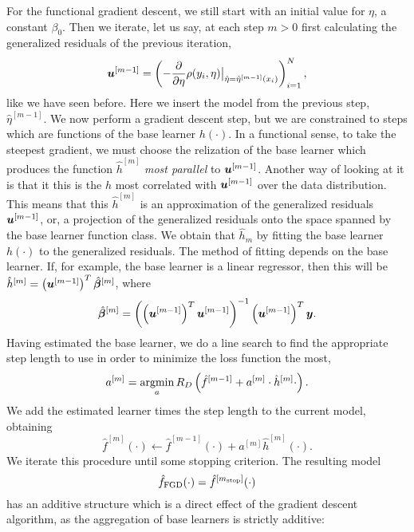 For the functional gradient descent, we still start with an initial value for $\eta$, a constant $\beta_0$.
Then we iterate, let us say, at each step $m>0$ first calculating the generalized residuals of the previous iteration,
\begin{equation}
    \bm{u}^{[m-1]}=\left(-\frac{\partial}{\partial \eta}\rho(y_i, \eta)\big\rvert_{\hat{\eta}=\hat{\eta}^{[m-1]}(x_i)}\right)_{i=1}^N,
\end{equation}
like we have seen before. Here we insert the model from the previous step, $\hat{\eta}^{[m-1]}$.
We now perform a gradient descent step, but we are constrained to steps which are functions of the base learner $h(\cdot)$.
In a functional sense, to take the steepest gradient, we must choose the relization of the base learner which produces the function $\hat{h}^{[m]}$ \textit{most parallel} to $\bm{u}^{[m-1]}$.
Another way of looking at it is that it this is the $h$ most  correlated with $\bm{u}^{[m-1]}$ over the data distribution.
This means that this $\hat{h}^{[m]}$ is an approximation of the generalized residuals $\bm{u}^{[m-1]}$, or, a projection of the generalized residuals onto the space spanned by the base learner function class.
We obtain that $\hat{h}_m$ by fitting the base learner $h(\cdot)$ to the generalized residuals.
The method of fitting depends on the base learner.
If, for example, the base learner is a linear regressor, then this will be $\hat{h}^{[m]}=\left(\bm{u}^{[m-1]}\right)^T\hat{\boldsymbol{\beta}}^{[m]}$, where
\begin{equation}
    \hat{\boldsymbol{\beta}}^{[m]}=\left(\left(\bm{u}^{[m-1]}\right)^T\bm{u}^{[m-1]}\right)^{-1}\left(\bm{u}^{[m-1]}\right)^T\bm{y}.
\end{equation}
Having estimated the base learner, we do a line search to find the appropriate step length to use in order to minimize the loss function the most,
\begin{equation}
    a^{[m]}=\operatorname*{argmin}_{a}R_D\left(\hat{f}^{[m-1]}+a^{[m]}\cdot\hat{h}^{[m]}{\cdot}\right).
\end{equation}
We add the estimated learner times the step length to the current model, obtaining
\begin{equation}
    \hat{f}^{[m]}(\cdot)\gets \hat{f}^{[m-1]}(\cdot)+a^{[m]}\hat{h}^{[m]}(\cdot).
\end{equation}
We iterate this procedure until some stopping criterion. The resulting model
\begin{equation}
    \hat{f}_{\text{FGD}}(\cdot)=\hat{f}^{[m_{\text{stop}}]}(\cdot)
\end{equation}
has an additive structure which is a direct effect of the gradient descent algorithm, as the aggregation of base learners is strictly additive:
